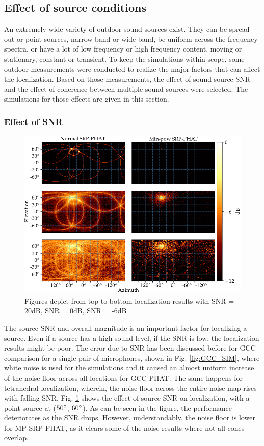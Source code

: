 \subsection{Effect of source conditions}
An extremely wide variety of outdoor sound sources exist. They can be spread-out or point sources, narrow-band or wide-band, be uniform across the frequency spectra, or have a lot of low frequency or high frequency content, moving or stationary, constant or transient. To keep the simulations within scope, some outdoor measurements were conducted to realize the major factors that can affect the localization. Based on those measurements, the effect of sound source SNR and the effect of coherence between multiple sound sources were selected. The simulations for those effects are given in this section.
\subsubsection{Effect of SNR}
\begin{figure}[H]
\centering
\includegraphics[width=\textwidth]{Figures/noiseSim.png}
\caption{Figures depict from top-to-bottom localization results with SNR = 20dB, SNR = 0dB, SNR = -6dB}
\label{fig:4mic1srcNoisy}
\end{figure}
The source SNR and overall magnitude is an important factor for localizing a source. Even if a source has a high sound level, if the SNR is low, the localization results might be poor. The error due to SNR has been discussed before for GCC comparison for a single pair of microphones, shown in Fig. \ref{fig:GCC_SIM}, where white noise is used for the simulations and it caused an almost uniform increase of the noise floor across all locations for GCC-PHAT. The same happens for tetrahedral localization, wherein, the noise floor across the entire noise map rises with falling SNR. Fig. \ref{fig:4mic1srcNoisy} shows the effect of source SNR on localization, with a point source at ($50\degree$, $60\degree$). As can be seen in the figure, the performance deteriorates as the SNR drops. However, understandably, the noise floor is lower for MP-SRP-PHAT, as it clears some of the noise results where not all cones overlap.
